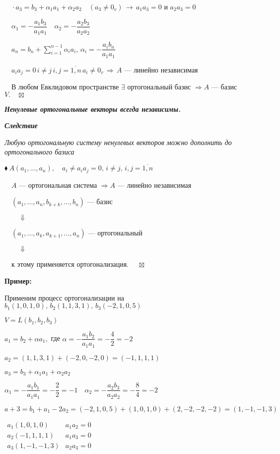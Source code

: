 \documentclass[a4paper, 12pt]{report}
\begin{document}
	$\quad \cdot a_3=b_3+ \alpha_1 a_1 + \alpha_2 a_2 \quad (a_3 \ne 0_v) \, \rightarrow \, a_1 a_3 =0$ и $a_2 a_3 =0$
	
	$\quad \alpha_1=- \dfrac{a_1 b_3}{a_1 a_1} \quad \alpha_2= - \dfrac{a_2 b_3}{a_2 a_2}$
	
	$\quad a_n=b_n + \sum_{i=1}^{n-1} \alpha_i a_i, \, \alpha_i = - \dfrac{a_i b_n}{a_1 a_1}$
	
	$\quad a_i a_j =0 \, i \ne j \, i,j=\overline{1,n} \, a_i \ne 0_v \, \Rightarrow \, A$ --- линейно независимая
	
	$\quad$В любом Евклидовом пространстве $\exists$ ортогональный базис $\Rightarrow A$ --- базис $V. \quad \boxtimes$
	\par \bigskip
	\textbf{\textit{Ненулевые ортогональные векторы всегда независимы.}}
	\par \bigskip
	\textit{\textbf{Следствие}}
	
	\textit{Любую ортогональную систему ненулевых векторов можно дополнить до ортогонального базиса}
	\par \bigskip
	$\blacklozenge\ A(a_1,...,a_n), \quad a_i \ne a_i a_j =0, \, i\ne j, \, i,j=\overline{1,n}$
	
	$\quad A$ --- ортогональная система $\Rightarrow A$ --- линейно независимая
	
	$\quad (a_1,...,a_n,b_{k+k},...,b_n)$ --- базис
	
	$\quad \quad \Downarrow$
	
	$\quad (a_1,...,a_k,a_{k+1},...,a_n)$ --- ортогональный
	
	$\quad \quad \Downarrow$
	
	$\quad$к этому применяется ортогонализация. $\quad \boxtimes$
	\par \bigskip
	\textbf{Пример:}
	
	Применим процесс ортогонализации на $b_1(1,0,1,0), \, b_2(1,1,3,1), \, b_3(-2,1,0,5)$
	
	$V=L(b_1,b_2,b_3)$
	
	$a_1=b_2+\alpha a_1,$ где $\alpha= - \dfrac{a_1 b_2}{a_1 a_1}=-\dfrac{4}{2}=-2 $
	
	$a_2=(1,1,3,1)+(-2,0,-2,0)=(-1,1,1,1)$
	
	$a_3=b_3+\alpha_1 a_1+ \alpha_2 a_2$
	
	$\alpha_1=- \dfrac{a_1 b_1}{a_1 a_1}=- \dfrac{2}{2}=-1 \quad \alpha_2=- \dfrac{a_2 b_3}{a_2 a_2}=- \dfrac{8}{4}=-2$
	
	$a+3=b_1+a_1-2 a_2=(-2,1,0,5)+(1,0,1,0)+(2,-2,-2,-2)=(1,-1,-1,3)$
	
	$ 
	\begin{matrix}
		a_1(1,0,1,0)& a_1 a_2=0\\
		a_2(-1,1,1,1)&a_1 a_3=0\\
		a_3(1,-1,-1,3)& a_2 a_3=0\\
	\end{matrix}$
	
\end{document}
